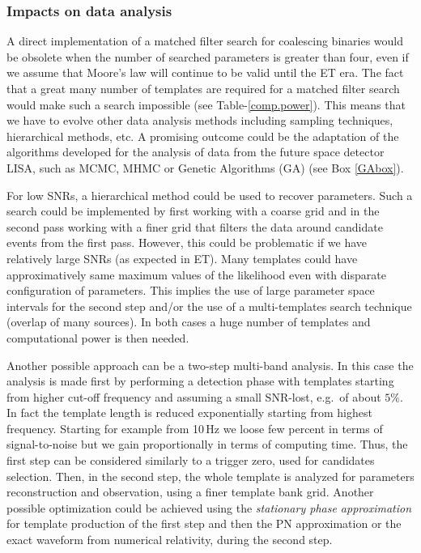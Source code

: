 \subsubsection{Impacts on data analysis}

A direct implementation of a matched filter search for coalescing binaries
would be obsolete when the number of searched parameters is greater than four, 
even if we assume that Moore's law will continue to be valid until the ET era.
The fact that a great many number of templates are required for
a matched filter search would make such a search impossible 
(see  Table-\ref{comp.power}).  This means that we have to evolve other data 
analysis methods including sampling techniques, hierarchical methods,
etc.  A promising outcome could be the adaptation of the algorithms developed 
for the analysis of data from the future space detector LISA, such as MCMC, MHMC or 
Genetic Algorithms (GA) (see Box \ref{GAbox}).

For low SNRs, a hierarchical method could be used to recover 
parameters. Such a search could be implemented by first working with
a coarse grid and in the second pass working with a finer grid that
filters the data around candidate events from the first pass. However, this could be 
problematic if we have relatively large SNRs (as expected in ET). Many 
templates could have approximatively same maximum values of the likelihood even 
with disparate configuration of parameters.
This implies the use of large parameter space intervals for the second step 
and/or the use of a multi-templates search technique (overlap of many sources). 
In both cases a huge number of templates and computational power is then 
needed. 

Another possible approach can be a two-step  multi-band analysis. In this case 
the analysis is made first by performing a detection phase with templates starting 
from higher cut-off frequency and assuming a small SNR-lost, e.g.\ of about 
$5\%$. In fact the template length is reduced exponentially starting from 
highest frequency. Starting for example from 10\,Hz we loose few percent in 
terms of signal-to-noise but we gain proportionally in terms of computing time. 
Thus, the first step can be considered similarly to a trigger zero, used for 
candidates selection. Then, in the second step, the whole template  is analyzed 
 for parameters reconstruction and observation, using a finer template bank 
grid. Another possible optimization could be achieved using the {\em stationary 
phase approximation} for template production of the first step  and then the PN 
approximation or the exact waveform from numerical relativity, during the 
second step. 
 
